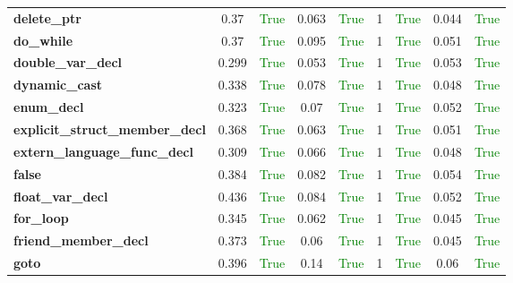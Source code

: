 \documentclass{article}
\begin{document}
\begin{xltabular}{\textwidth}{lcccccccc}
\textbf{{\fontsize{10}{12}\selectfont delete\_ptr}}& 0.37&\textcolor{green}{True}& 0.063&\textcolor{green}{True}& 1&\textcolor{green}{True}& 0.044&\textcolor{green}{True} \\[0.5ex]
\textbf{{\fontsize{10}{12}\selectfont do\_while}}& 0.37&\textcolor{green}{True}& 0.095&\textcolor{green}{True}& 1&\textcolor{green}{True}& 0.051&\textcolor{green}{True} \\[0.5ex]
\textbf{{\fontsize{10}{12}\selectfont double\_var\_decl}}& 0.299&\textcolor{green}{True}& 0.053&\textcolor{green}{True}& 1&\textcolor{green}{True}& 0.053&\textcolor{green}{True} \\[0.5ex]
\textbf{{\fontsize{10}{12}\selectfont dynamic\_cast}}& 0.338&\textcolor{green}{True}& 0.078&\textcolor{green}{True}& 1&\textcolor{green}{True}& 0.048&\textcolor{green}{True} \\[0.5ex]
\textbf{{\fontsize{10}{12}\selectfont enum\_decl}}& 0.323&\textcolor{green}{True}& 0.07&\textcolor{green}{True}& 1&\textcolor{green}{True}& 0.052&\textcolor{green}{True} \\[0.5ex]
\textbf{{\fontsize{10}{12}\selectfont explicit\_struct\_member\_decl}}& 0.368&\textcolor{green}{True}& 0.063&\textcolor{green}{True}& 1&\textcolor{green}{True}& 0.051&\textcolor{green}{True} \\[0.5ex]
\textbf{{\fontsize{10}{12}\selectfont extern\_language\_func\_decl}}& 0.309&\textcolor{green}{True}& 0.066&\textcolor{green}{True}& 1&\textcolor{green}{True}& 0.048&\textcolor{green}{True} \\[0.5ex]
\textbf{{\fontsize{10}{12}\selectfont false}}& 0.384&\textcolor{green}{True}& 0.082&\textcolor{green}{True}& 1&\textcolor{green}{True}& 0.054&\textcolor{green}{True} \\[0.5ex]
\textbf{{\fontsize{10}{12}\selectfont float\_var\_decl}}& 0.436&\textcolor{green}{True}& 0.084&\textcolor{green}{True}& 1&\textcolor{green}{True}& 0.052&\textcolor{green}{True} \\[0.5ex]
\textbf{{\fontsize{10}{12}\selectfont for\_loop}}& 0.345&\textcolor{green}{True}& 0.062&\textcolor{green}{True}& 1&\textcolor{green}{True}& 0.045&\textcolor{green}{True} \\[0.5ex]
\textbf{{\fontsize{10}{12}\selectfont friend\_member\_decl}}& 0.373&\textcolor{green}{True}& 0.06&\textcolor{green}{True}& 1&\textcolor{green}{True}& 0.045&\textcolor{green}{True} \\[0.5ex]
\textbf{{\fontsize{10}{12}\selectfont goto}}& 0.396&\textcolor{green}{True}& 0.14&\textcolor{green}{True}& 1&\textcolor{green}{True}& 0.06&\textcolor{green}{True} \\[0.5ex]

\end{xltabular}
\end{document}
